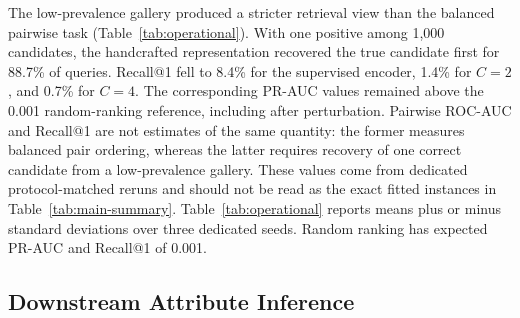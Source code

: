 \documentclass[journal]{IEEEtran}
\begin{document}
The low-prevalence gallery produced a stricter retrieval view than the
balanced pairwise task (Table~\ref{tab:operational}). With one positive among
1,000 candidates, the handcrafted representation recovered the true candidate first
for 88.7\% of queries. Recall@1 fell to 8.4\% for the supervised encoder,
1.4\% for $C=2$, and 0.7\% for $C=4$. The corresponding PR-AUC values remained
above the 0.001 random-ranking reference, including after perturbation.
Pairwise ROC-AUC and Recall@1 are not estimates of the same quantity: the
former measures balanced pair ordering, whereas the latter requires recovery
of one correct candidate from a low-prevalence gallery. These values come
from dedicated protocol-matched reruns and should not be read as the exact
fitted instances in Table~\ref{tab:main-summary}. Table~\ref{tab:operational}
reports means plus or minus standard deviations over three dedicated seeds.
Random ranking has expected PR-AUC and Recall@1 of 0.001.

\begin{table}[ht]
\centering
\scriptsize
\setlength{\tabcolsep}{3pt}
\caption{Operational gallery performance at prevalence 0.001.}
\label{tab:operational}
\end{table}

\subsection{Downstream Attribute Inference}
\label{subsec:results-attribute}
\end{document}
